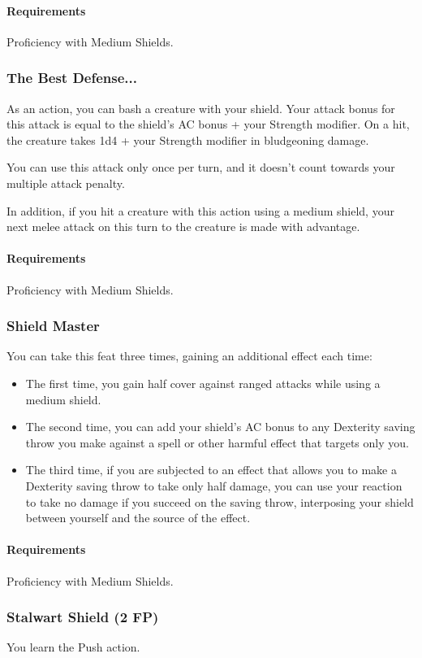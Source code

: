     \paragraph{Requirements} Proficiency with Medium Shields.
\subsubsection{The Best Defense...} \label{feat::thebestdefense}
    As an action, you can bash a creature with your shield.
    Your attack bonus for this attack is equal to the shield's AC bonus + your Strength modifier.
    On a hit, the creature takes 1d4 + your Strength modifier in bludgeoning damage.

    You can use this attack only once per turn, and it doesn't count towards your multiple attack penalty.

    In addition, if you hit a creature with this action using a medium shield, your next melee attack on this turn to the creature is made with advantage.
    \paragraph{Requirements} Proficiency with Medium Shields.
\subsubsection{Shield Master} \label{feat::shieldmaster}
    You can take this feat three times, gaining an additional effect each time:
    \begin{itemize}
        \item The first time, you gain half cover against ranged attacks while using a medium shield.
        \item The second time, you can add your shield's AC bonus to any Dexterity saving throw you make against a spell or other harmful effect that targets only you.
        \item The third time, if you are subjected to an effect that allows you to make a Dexterity saving throw to take only half damage, you can use your reaction to take no damage if you succeed on the saving throw, interposing your shield between yourself and the source of the effect.
    \end{itemize}
    \paragraph{Requirements} Proficiency with Medium Shields.
\subsubsection{Stalwart Shield (2 FP)} \label{feat::stalwartshield}
    You learn the Push action.

